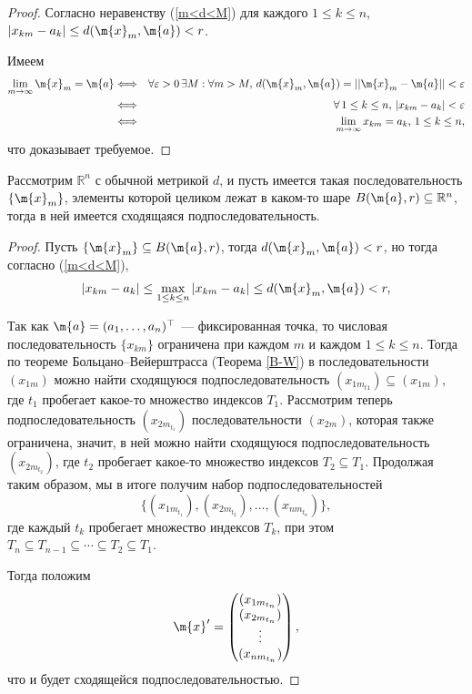 \begin{proof}
Согласно неравенству (\ref{m<d<M}) для каждого $1 \le k \le n$, $|x_{km} - a_k| \le d(\m{x}_m, \m{a})<r$.

Имеем 
    \begin{eqnarray*}
        \lim_{m \to \infty} \m{x}_m = \m{a} &\Longleftrightarrow& \forall \varepsilon >0 \, \exists M : \forall m >M, \, d(\m{x}_m, \m{a}) = ||\m{x}_m - \m{a}|| < \varepsilon \\
        &\Longleftrightarrow& \forall\, 1 \le k \le n,\, |x_{km} - a_k| < \varepsilon \\
        &\Longleftrightarrow & \lim_{m \to \infty}x_{km} = a_k,\, 1 \le k \le n,
    \end{eqnarray*}
    что доказывает требуемое.
\end{proof}


\begin{theorem}\label{genB-W}
    Рассмотрим $\mathbb{R}^n$ с обычной метрикой $d$, и пусть имеется такая последовательность $\{\m{x}_m\}$, элементы которой целиком лежат в каком-то шаре $B(\m{a},r)\subseteq \mathbb{R}^n$, тогда в ней имеется сходящаяся подпоследовательность.
\end{theorem}
\begin{proof}

    Пусть $\{\m{x}_m\} \subseteq B(\m{a},r)$, тогда $d(\m{x}_m, \m{a})<r$, но тогда согласно (\ref{m<d<M}),
    \[
     |x_{km} - a_k| \le \max_{1\le k \le n}| x_{km} - a_{k}  | \le d(\m{x}_m, \m{a})<r,
    \]

Так как $\m{a} =(a_1,\ldots, a_n)^\top$ --- фиксированная точка, то числовая последовательность $\{x_{km}\}$ ограничена при каждом $m$ и каждом $1\le k \le n$. Тогда по теореме Больцано--Вейерштрасса (Теорема \ref{B-W}) в последовательности $(x_{1m})$ можно найти сходящуюся подпоследовательность $(x_{1m_{t1}}) \subseteq (x_{1m})$, где $t_1$ пробегает какое-то множество индексов $T_1$. Рассмотрим теперь подпоследовательность $(x_{2m_{t_1}})$ последовательности $(x_{2m})$, которая также ограничена, значит, в ней можно найти сходящуюся подпоследовательность $(x_{2m_{t_2}})$, где $t_2$ пробегает какое-то множество индексов $T_2 \subseteq T_1$. Продолжая таким образом, мы в итоге получим набор подпоследовательностей
\[
 \{(x_{1m_{t_1}}), (x_{2m_{t_2}}), \ldots, (x_{nm_{t_n}})\},
\]
где каждый $t_k$ пробегает множество индексов $T_k$, при этом $T_n \subseteq T_{n-1} \subseteq \cdots \subseteq T_2 \subseteq T_1.$

Тогда положим 
\[
  \m{x}' = \begin{pmatrix}
      (x_{1m_{t_n}}) \\
      (x_{2m_{t_n}}) \\
      \vdots \\
      (x_{nm_{t_n}})
  \end{pmatrix},
\]
что и будет сходящейся подпоследовательностью.    
\end{proof}










